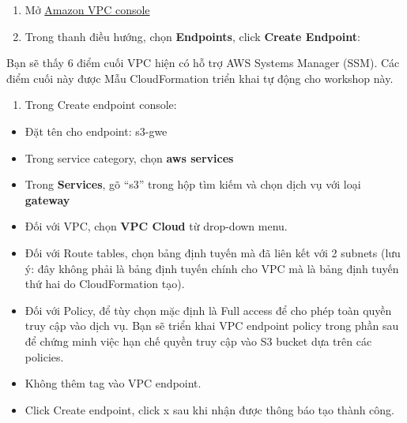 \begin{enumerate}
\def\labelenumi{\arabic{enumi}.}
\tightlist
\item
  Mở
  \href{https://us-east-1.console.aws.amazon.com/vpc/home?region=us-east-1\#Home:}{Amazon
  VPC console}
\item
  Trong thanh điều hướng, chọn \textbf{Endpoints}, click \textbf{Create
  Endpoint}:
\end{enumerate}

Bạn sẽ thấy 6 điểm cuối VPC hiện có hỗ trợ AWS Systems Manager (SSM).
Các điểm cuối này được Mẫu CloudFormation triển khai tự động cho
workshop này.

\begin{enumerate}
\def\labelenumi{\arabic{enumi}.}
\setcounter{enumi}{2}
\tightlist
\item
  Trong Create endpoint console:
\end{enumerate}

\begin{itemize}
\item
  Đặt tên cho endpoint: s3-gwe
\item
  Trong service category, chọn \textbf{aws services}
\item
  Trong \textbf{Services}, gõ ``s3'' trong hộp tìm kiếm và chọn dịch vụ
  với loại \textbf{gateway}
\item
  Đối với VPC, chọn \textbf{VPC Cloud} từ drop-down menu.
\item
  Đối với Route tables, chọn bảng định tuyến mà đã liên kết với 2
  subnets (lưu ý: đây không phải là bảng định tuyến chính cho VPC mà là
  bảng định tuyến thứ hai do CloudFormation tạo).
\item
  Đối với Policy, để tùy chọn mặc định là Full access để cho phép toàn
  quyền truy cập vào dịch vụ. Bạn sẽ triển khai VPC endpoint policy
  trong phần sau để chứng minh việc hạn chế quyền truy cập vào S3 bucket
  dựa trên các policies.
\item
  Không thêm tag vào VPC endpoint.
\item
  Click Create endpoint, click x sau khi nhận được thông báo tạo thành
  công.
\end{itemize}
